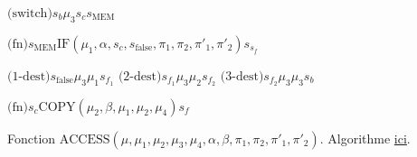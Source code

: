 \documentclass{report}
\newcommand{\aramsw}[3]{\text{(switch)}	s_{#1} #2 #3} %
\newcommand{\aramdest}[5]{\text{(#1-dest)} 	s_{#2} #3 #4 s_{#5}} %
\newcommand{\aramfn}[3]{\text{(fn)} 		s_{#1} #2 s_{#3}}
\begin{document}
\begin{appendices}
\begin{algorithm}[H]
					$\aramsw{b}{\mu_3}{s_{c} s_{\text{MEM}}}$ \;
					
					\espace
					
					$\aramfn{\text{MEM}}{\text{IF}\left( \mu_1, \alpha, s_{c}, s_{\text{false}}, \pi_1, \pi_2, \pi'_1, \pi'_2 \right)}{s_f} $\;
					
					\espace 
														
					$\aramdest{$1$}{\text{false}}{\mu_3}{\mu_1}{f_1}$ \;
					$\aramdest{$2$}{f_1}{\mu_3}{\mu_2}{f_2}$ \;
					$\aramdest{$3$}{f_2}{\mu_3}{\mu_3}{b}$ \;
					
					\espace 

					
					$\aramfn{c}{\text{COPY}\left( \mu_2, \beta, \mu_1, \mu_2, \mu_4 \right)}{f}$ \;
					
					\caption{Fonction $\text{ACCESS}\left( \mu, \mu_1, \mu_2, \mu_3, \mu_4, \alpha, \beta, \pi_1, \pi_2, \pi'_1, \pi'_2\right)$. Algorithme \hyperref[algo:A_RAM_fn_ACCESS]{ici}. }
				\end{algorithm}
				
				\espace
				
				
				
			\end{appendices}
			
			
			
			
			
			
			
			
\end{document}
